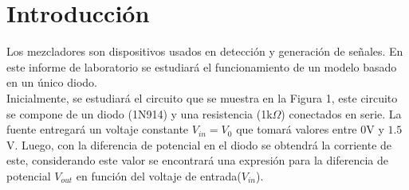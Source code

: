 \documentclass[letterpaper,oneside]{article}
\begin{document}
	
\templatePortrait

\templatePagecfg

%
%

\templateFinalcfg


\section{Introducción}
Los mezcladores son dispositivos usados en detección y generación de señales. En este informe de laboratorio se estudiará el funcionamiento de un modelo basado en un único diodo.\\

Inicialmente, se estudiará el circuito que se muestra en la Figura 1, este circuito se compone de un diodo (1N914) y una resistencia (1k$\Omega$) conectados en serie. La fuente entregará un voltaje constante $V_{in}= V_0$ que tomará valores entre $0$V y $1.5$V. Luego, con la diferencia de potencial en el diodo se obtendrá la corriente de este, considerando este valor se encontrará una expresión para la diferencia de potencial $V_{out}$ en función del voltaje de entrada($V_{in}$).\\
\end{document}
